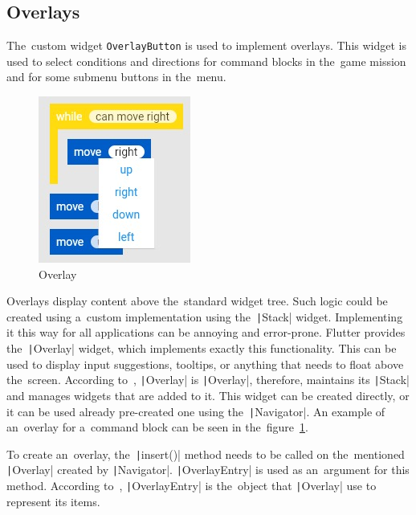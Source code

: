 \subsection{Overlays}

The~custom widget \texttt{OverlayButton} is used to implement overlays.
This widget is used to select conditions and directions for command blocks in the~game mission and for some submenu buttons in the~menu.

\begin{figure}
    \centering
    \includegraphics[width=0.4\linewidth]{assets/implementation/overlay.jpeg}
    \caption{Overlay}
    \label{fig:overlay}
\end{figure}

Overlays display content above the~standard widget tree.
Such logic could be created using a~custom implementation using the~\texttt|Stack| widget.
Implementing it this way for all applications can be annoying and error-prone.
Flutter provides the~\texttt|Overlay| widget, which implements exactly this functionality.
This can be used to display input suggestions, tooltips, or anything that needs to float above the~screen.
According to~\cite{a2022_material}, \texttt|Overlay| is 
\texttt|Overlay|, therefore, maintains its \texttt|Stack| and manages widgets that are added to it.
This widget can be created directly, or it can be used already pre-created one using the~\texttt|Navigator|.
An example of an~overlay for a~command block can be seen in the~figure~\ref{fig:overlay}.

To create an~overlay, the~\texttt|insert()| method needs to be called on the~mentioned \texttt|Overlay| created by \texttt|Navigator|.
\texttt|OverlayEntry| is used as an~argument for this method.
According to~\cite{a2022_material}, \texttt|OverlayEntry| is the~object that \texttt|Overlay| use to represent its items.

